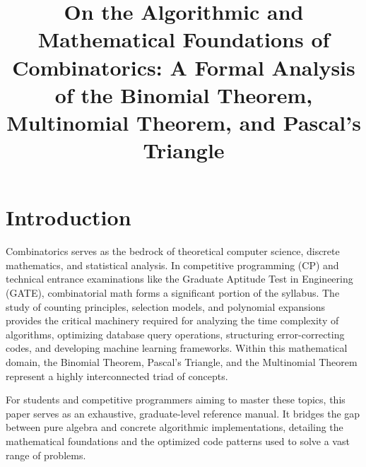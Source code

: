 \documentclass[10pt,journal,compsoc,onecolumn]{IEEEtran}
\begin{document}
\title{On the Algorithmic and Mathematical Foundations of Combinatorics: A Formal Analysis of the Binomial Theorem, Multinomial Theorem, and Pascal's Triangle}


\maketitle
\IEEEdisplaynontitleabstractindextext
\IEEEpeerreviewmaketitle

\section{Introduction}
\label{sec:intro}

Combinatorics serves as the bedrock of theoretical computer science, discrete mathematics, and statistical analysis. In competitive programming (CP) and technical entrance examinations like the Graduate Aptitude Test in Engineering (GATE), combinatorial math forms a significant portion of the syllabus. The study of counting principles, selection models, and polynomial expansions provides the critical machinery required for analyzing the time complexity of algorithms, optimizing database query operations, structuring error-correcting codes, and developing machine learning frameworks. Within this mathematical domain, the Binomial Theorem, Pascal's Triangle, and the Multinomial Theorem represent a highly interconnected triad of concepts.

For students and competitive programmers aiming to master these topics, this paper serves as an exhaustive, graduate-level reference manual. It bridges the gap between pure algebra and concrete algorithmic implementations, detailing the mathematical foundations and the optimized code patterns used to solve a vast range of problems.
\end{document}
